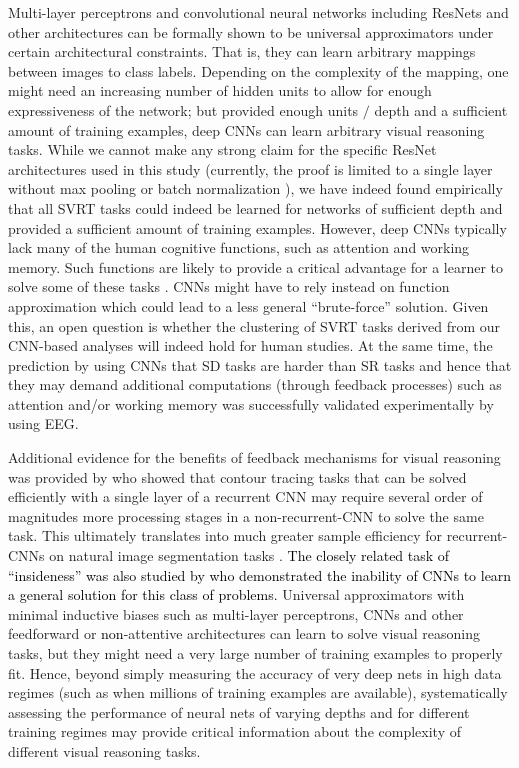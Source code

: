 Multi-layer perceptrons and convolutional neural networks including ResNets and other architectures can be formally shown to be universal approximators under certain architectural constraints. That is, they can learn arbitrary mappings between images to class labels. Depending on the complexity of the mapping, one might need an increasing number of hidden units to allow for enough expressiveness of the network; but provided enough units $/$ depth and a sufficient amount of  training examples, deep CNNs can learn arbitrary visual reasoning tasks. While we cannot make any strong claim for the specific ResNet architectures used in this study (currently, the proof is limited to a single layer without max pooling or batch normalization \citep{lin2018resnet}), we have indeed found empirically that all SVRT tasks could indeed be learned for networks of sufficient depth and provided a sufficient amount of training examples.
However, deep CNNs typically lack many of the human cognitive functions, such as attention and working memory. Such functions are likely to provide a critical advantage for a learner to solve some of these tasks \citep{10.7551/mitpress/1187.001.0001}. CNNs might have to rely instead on function approximation which could lead to a less general ``brute-force'' solution. 
Given this, an open question is whether the clustering of SVRT tasks derived from our CNN-based analyses will indeed hold for human studies. At the same time, the prediction by \citet{kim2018not} using CNNs that SD tasks are harder than SR tasks and hence that they may demand additional computations (through feedback processes) such as attention and/or working memory was successfully validated experimentally by \citet{AlamiaENEURO.0267-20.2020} using EEG. 

Additional evidence for the benefits of feedback mechanisms for visual reasoning was provided by  \citet{linsley2018learning} who showed that contour tracing tasks that can be solved efficiently with a single layer of a recurrent CNN may require several order of magnitudes more processing stages in a non-recurrent-CNN to solve the same task. This ultimately translates into much greater sample efficiency for recurrent-CNNs on natural image segmentation tasks \citep{linsley2020recurrent}. \textcolor{black}{The closely related task of ``insideness'' was also studied by \citet{villalobos2021neural} who demonstrated the inability of CNNs to learn a general solution for this class of problems.}
Universal approximators with minimal inductive biases such as multi-layer perceptrons, CNNs and other feedforward or \textcolor{black}{non}-attentive architectures can learn to solve visual reasoning tasks, but they might need a very large number of training examples to properly fit. Hence, beyond simply measuring the accuracy of very deep nets in high data regimes (such as when millions of training examples are available), systematically assessing the performance of neural nets of varying depths and for different training regimes may provide critical information about the complexity of different visual reasoning tasks.